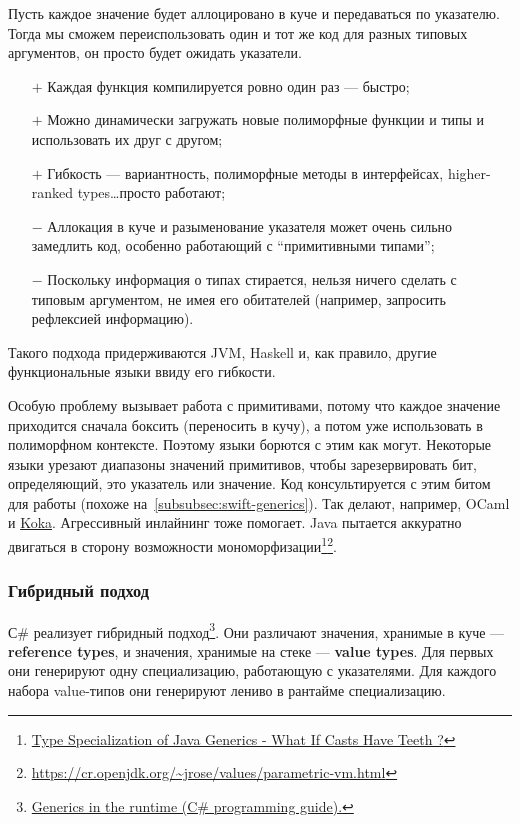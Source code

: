 \documentclass[12pt]{article}
\newcommand{\vocab}[1]{\textbf{#1}} %
\newcommand{\positive}{$+$} %
\newcommand{\negative}{{\color{red} $-$}} %
\begin{document}
    Пусть каждое значение будет аллоцировано в куче и передаваться по указателю.
    Тогда мы сможем переиспользовать один и тот же код для разных типовых аргументов, он просто будет ожидать указатели.

    \begin{itemize}
        \item[\positive] Каждая функция компилируется ровно один раз --- быстро;
        \item[\positive] Можно динамически загружать новые полиморфные функции и типы и использовать их друг с другом;
        \item[\positive] Гибкость --- вариантность, полиморфные методы в интерфейсах, higher-ranked types\ldots просто работают;
        \item[\negative] Аллокация в куче и разыменование указателя может очень сильно замедлить код, особенно работающий с ``примитивными типами'';
        \item[\negative] Поскольку информация о типах стирается, нельзя ничего сделать с типовым аргументом, не имея его обитателей (например, запросить рефлексией информацию).
    \end{itemize}

    Такого подхода придерживаются JVM, Haskell и, как правило, другие функциональные языки ввиду его гибкости.

    Особую проблему вызывает работа с примитивами, потому что каждое значение приходится сначала боксить (переносить в кучу), а потом уже использовать в полиморфном контексте.
    Поэтому языки борются с этим как могут.
    Некоторые языки урезают диапазоны значений примитивов, чтобы зарезервировать бит, определяющий, это указатель или значение.
    Код консультируется с этим битом для работы (похоже на~\ref{subsubsec:swift-generics}).
    Так делают, например, OCaml и \href{https://koka-lang.github.io/koka/doc/book.html#sec-value-types}{Koka}.
    Агрессивный инлайнинг тоже помогает.
    Java пытается аккуратно двигаться в сторону возможности мономорфизации\footnote{\href{https://youtu.be/JI09cs2yUgY?si=MLkRs31mN1koXIu1}{Type Specialization of Java Generics - What If Casts Have Teeth ?}}\footnote{\url{https://cr.openjdk.org/~jrose/values/parametric-vm.html}}.

    \subsubsection{Гибридный подход}

    С\# реализует гибридный подход\footnote{\href{https://learn.microsoft.com/en-us/dotnet/csharp/programming-guide/generics/generics-in-the-run-time}{Generics in the runtime (C\# programming guide).}}.
    Они различают значения, хранимые в куче --- \vocab{reference types}, и значения, хранимые на стеке --- \vocab{value types}.
    Для первых они генерируют одну специализацию, работающую с указателями.
    Для каждого набора value-типов они генерируют лениво в рантайме специализацию.
\end{document}
